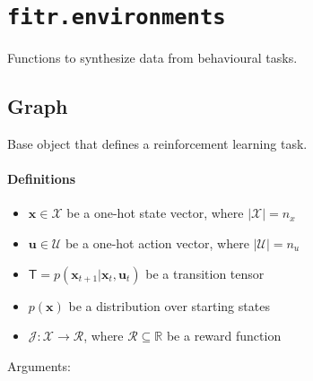 \hypertarget{fitr.environments}{%
\section{\texorpdfstring{\texttt{fitr.environments}}{fitr.environments}}\label{fitr.environments}}

Functions to synthesize data from behavioural tasks.

\hypertarget{graph}{%
\subsection{Graph}\label{graph}}

\begin{Shaded}
\begin{Highlighting}[]
\end{Highlighting}
\end{Shaded}

Base object that defines a reinforcement learning task.

\hypertarget{definitions}{%
\paragraph{Definitions}\label{definitions}}

\begin{itemize}
\tightlist
\item
  \(\mathbf x \in \mathcal X\) be a one-hot state vector, where
  \(|\mathcal X|=n_x\)
\item
  \(\mathbf u \in \mathcal U\) be a one-hot action vector, where
  \(|\mathcal U|=n_u\)
\item
  \(\mathsf T = p(\mathbf x_{t+1}|\mathbf x_t, \mathbf u_t)\) be a
  transition tensor
\item
  \(p(\mathbf x)\) be a distribution over starting states
\item
  \(\mathcal J: \mathcal X \to \mathcal R\), where
  \(\mathcal R \subseteq \mathbb R\) be a reward function
\end{itemize}

Arguments:

